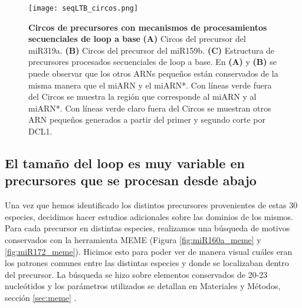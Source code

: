 \begin{landscape}
    \begin{figure}[htbp!] 
        \centering    
        \texttt{[image: seqLTB\_circos.png]}
        \caption[Circos de precursores con mecanismos de procesamientos secuenciales de loop a base]{
        \textbf{Circos de precursores con mecanismos de procesamientos secuenciales de loop a base}
		 \textbf{(A)} Circos del precursor del miR319a.
		 \textbf{(B)} Circos del precursor del miR159b.
		 \textbf{(C)} Estructura de precursores procesados secuenciales de loop a base.
		 En \textbf{(A)} y \textbf{(B)} se puede observar que los otros ARNs pequeños están conservados de la misma manera que el miARN y el miARN*.
        Con líneas verde fuera del Circos se muestra la región que corresponde al miARN y al miARN*. 
        Con líneas verde claro fuera del Circos se muestran otros ARN pequeños generados a partir del primer y segundo corte por DCL1.
		}
         \label{fig:seqLTB_circos}
    \end{figure}
\end{landscape}


\subsection{El tamaño del loop es muy variable en precursores que se procesan desde abajo}

Una vez que hemos identificado los distintos precursores provenientes de estas 30 especies, decidimos hacer estudios adicionales sobre las dominios de los mismos.
Para cada precursor en distintas especies, realizamos una búsqueda de motivos conservados con la herramienta MEME \citep{pmid22115189} (Figura \ref{fig:miR160a_meme} y \ref{fig:miR172_meme}).
Hicimos esto para poder ver de manera visual cuáles eran los patrones comunes entre las distintas especies y donde se localizaban dentro del precursor.
La búsqueda se hizo sobre elementos conservados de 20-23 nucleótidos y los parámetros utilizados se detallan en Materiales y Métodos, sección \ref{sec:meme}	.


